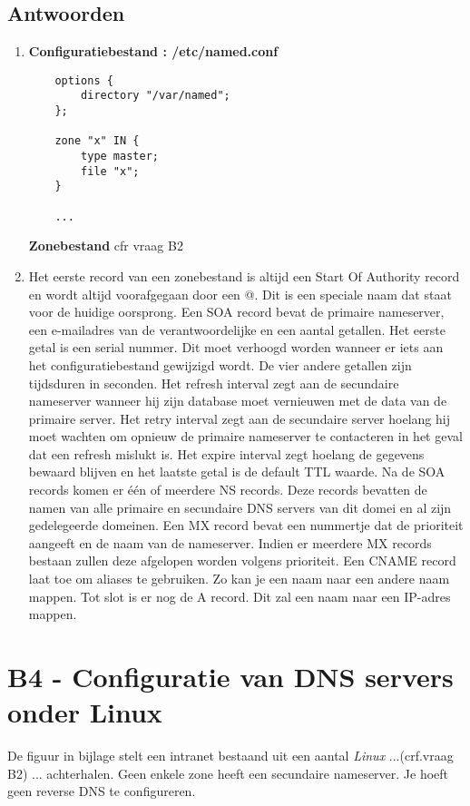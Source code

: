\documentclass{report}
\begin{document}
\subsection{Antwoorden}
\begin{enumerate}
\item {
	\textbf{Configuratiebestand : /etc/named.conf}
	\begin{lstlisting}
	options {
		directory "/var/named";
	};
	
	zone "x" IN {
		type master;
		file "x";
	}
	
	...
	\end{lstlisting}
	\textbf{Zonebestand} cfr vraag B2
}

\item {
	Het eerste record van een zonebestand is altijd een Start Of Authority record en wordt altijd voorafgegaan door een @. Dit is een speciale naam dat staat voor de huidige oorsprong. Een SOA record bevat de primaire nameserver, een e-mailadres van de verantwoordelijke en een aantal getallen. Het eerste getal is een serial nummer. Dit moet verhoogd worden wanneer er iets aan het configuratiebestand gewijzigd wordt. De vier andere getallen zijn tijdsduren in seconden. Het refresh interval zegt aan de secundaire nameserver wanneer hij zijn database moet vernieuwen met de data van de primaire server. Het retry interval zegt aan de secundaire server hoelang hij moet wachten om opnieuw de primaire nameserver te contacteren in het geval dat een refresh mislukt is. Het expire interval zegt hoelang de gegevens bewaard blijven en het laatste getal is de default TTL waarde. Na de SOA records komen er één of meerdere NS records. Deze records bevatten de namen van alle primaire en secundaire DNS servers van dit domei en al zijn gedelegeerde domeinen. Een MX record bevat een nummertje dat de prioriteit aangeeft en de naam van de nameserver. Indien er meerdere MX records bestaan zullen deze afgelopen worden volgens prioriteit. Een CNAME record laat toe om aliases te gebruiken. Zo kan je een naam naar een andere naam mappen. Tot slot is er nog de A record. Dit zal een naam naar een IP-adres mappen.
}
\end{enumerate}

\section{B4 - Configuratie van DNS servers onder Linux}
De figuur in bijlage stelt een intranet bestaand uit een aantal \textit{Linux} ...(crf.vraag B2) ... achterhalen. Geen enkele zone heeft een secundaire nameserver. Je hoeft geen reverse DNS te configureren.
\end{document}
